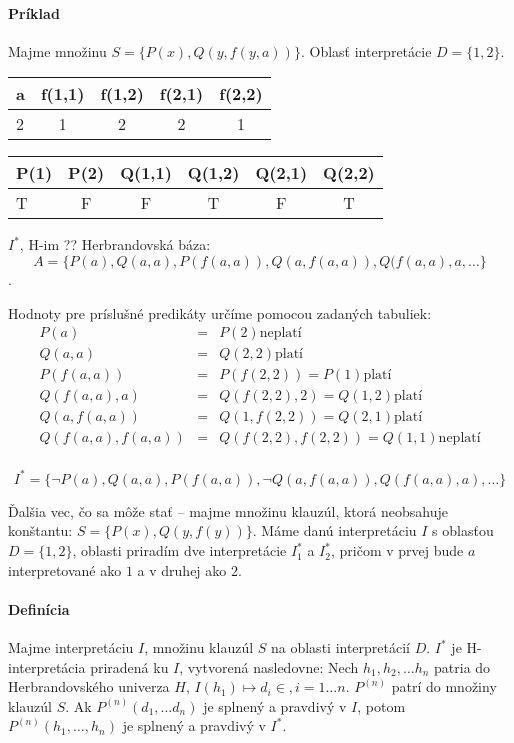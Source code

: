 \paragraph{Príklad} Majme množinu $S = \{ P(x), Q(y, f(y,a)) \}$. Oblasť
interpretácie $D = \{1,2\}$.

\begin{tabular}{|l|c|c|c|c|}
\hline
a & f(1,1) & f(1,2) & f(2,1) & f(2,2) \\
\hline
2 & 1 & 2 & 2 & 1 \\
\hline
\end{tabular}

\begin{tabular}{|l|c|c|c|c|c|}
\hline
P(1) & P(2) & Q(1,1) & Q(1,2) & Q(2,1) & Q(2,2) \\
\hline
T & F & F & T & F & T \\
\hline
\end{tabular}

$I^*$, H-im ??
Herbrandovská báza: $$A=\{ P(a), Q(a,a), P(f(a,a)), Q(a,f(a,a)), Q(f(a,a), a,
\ldots \}$$.

Hodnoty pre príslušné predikáty určíme pomocou zadaných tabuliek:
$$
\begin{array}{lll}
P(a) &=& P(2) \mbox{neplatí} \\
Q(a,a) &=& Q(2,2) \mbox{platí} \\
P(f(a,a)) &=& P(f(2,2)) = P(1) \mbox{platí} \\
Q(f(a,a),a) &=& Q(f(2,2),2) = Q(1,2) \mbox{platí} \\
Q(a,f(a,a)) &=& Q(1,f(2,2)) = Q(2,1) \mbox{platí} \\
Q(f(a,a),f(a,a)) &=& Q(f(2,2), f(2,2)) = Q(1,1) \mbox{neplatí} \\
\end{array}
$$

$$I^* = \{ \neg P(a), Q(a,a), P(f(a,a)), \neg Q(a,f(a,a)), Q(f(a,a),a), \ldots
\}$$

\par
Ďalšia vec, čo sa môže stať -- majme množinu klauzúl, ktorá neobsahuje
konštantu: $S=\{P(x), Q(y,f(y)) \}$. Máme danú interpretáciu $I$ s oblasťou
$D=\{1,2\}$, oblasti priradím dve interpretácie $I_1^*$ a $I_2^*$, pričom v
prvej bude $a$ interpretované ako $1$ a v druhej ako $2$.

\paragraph{Definícia} Majme interpretáciu $I$, množinu klauzúl $S$ na oblasti
interpretácií $D$. $I^*$ je H-interpretácia priradená ku $I$, vytvorená
nasledovne: Nech $h_1, h_2, \ldots h_n$ patria do Herbrandovského univerza $H$,
$I(h_1) \mapsto d_i \in , i=1 \ldots n$. $P^{(n)}$ patrí do množiny klauzúl $S$.
Ak $P^{(n)}(d_1, \ldots d_n)$ je splnený a pravdivý v $I$, potom
$P^{(n)}(h_1,\ldots,h_n)$ je splnený a pravdivý v $I^*$.

